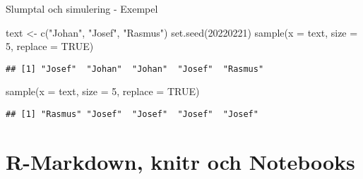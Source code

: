\documentclass[
  11pt,
  ignorenonframetext,
  handout]{beamer}
\newenvironment{Shaded}{\begin{snugshade}}{\end{snugshade}}
\newcommand{\AttributeTok}[1]{\textcolor[rgb]{0.77,0.63,0.00}{#1}}
\newcommand{\ConstantTok}[1]{\textcolor[rgb]{0.00,0.00,0.00}{#1}}
\newcommand{\DecValTok}[1]{\textcolor[rgb]{0.00,0.00,0.81}{#1}}
\newcommand{\FunctionTok}[1]{\textcolor[rgb]{0.00,0.00,0.00}{#1}}
\newcommand{\NormalTok}[1]{#1}
\newcommand{\OtherTok}[1]{\textcolor[rgb]{0.56,0.35,0.01}{#1}}
\newcommand{\StringTok}[1]{\textcolor[rgb]{0.31,0.60,0.02}{#1}}
\begin{document}
\begin{frame}[fragile]{Slumptal och simulering - Exempel}
\protect\hypertarget{slumptal-och-simulering---exempel-1}{}
\begin{Shaded}
\begin{Highlighting}[]
\NormalTok{text }\OtherTok{\textless{}{-}} \FunctionTok{c}\NormalTok{(}\StringTok{"Johan"}\NormalTok{, }\StringTok{"Josef"}\NormalTok{, }\StringTok{"Rasmus"}\NormalTok{)}
\FunctionTok{set.seed}\NormalTok{(}\DecValTok{20220221}\NormalTok{)}
\FunctionTok{sample}\NormalTok{(}\AttributeTok{x =}\NormalTok{ text, }\AttributeTok{size =} \DecValTok{5}\NormalTok{, }\AttributeTok{replace =} \ConstantTok{TRUE}\NormalTok{)}
\end{Highlighting}
\end{Shaded}

\pause

\begin{verbatim}
## [1] "Josef"  "Johan"  "Johan"  "Josef"  "Rasmus"
\end{verbatim}

\pause

\begin{Shaded}
\begin{Highlighting}[]
\FunctionTok{sample}\NormalTok{(}\AttributeTok{x =}\NormalTok{ text, }\AttributeTok{size =} \DecValTok{5}\NormalTok{, }\AttributeTok{replace =} \ConstantTok{TRUE}\NormalTok{)}
\end{Highlighting}
\end{Shaded}

\pause

\begin{verbatim}
## [1] "Rasmus" "Josef"  "Josef"  "Josef"  "Josef"
\end{verbatim}
\end{frame}

\hypertarget{r-markdown-knitr-och-notebooks}{%
\section{R-Markdown, knitr och
Notebooks}\label{r-markdown-knitr-och-notebooks}}
\end{document}
